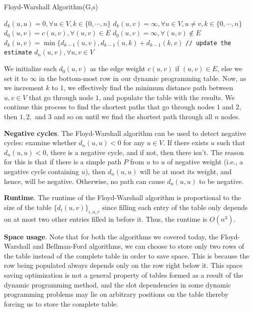 \documentclass [12pt]{article}
\theoremstyle{definition}
\begin{document}
\begin{algorithm}
\caption{Floyd-Warshall Algorithm(G,s)}
\label{alg:floyd-warshall}
\begin{algorithmic}
\STATE $d_k(u,u) = 0, \forall u \in V, k \in \{0, \cdots, n\}$
\STATE $d_k(u,v) = \infty, \forall u \in V, u\neq v, k \in \{0, \cdots, n\}$
\STATE $d_0(u,v) = c(u,v), \forall (u,v) \in E$
\STATE $d_0(u,v) = \infty, \forall (u,v) \notin E$
    \STATE $d_k(u,v) = \min\{ d_{k-1}(u,v), d_{k-1}(u,k) + d_{k-1}(k,v)$ \texttt{// update the estimate}
  \ENDFOR
\ENDFOR
\RETURN $d_n(u,v), \forall u,v \in V$
\end{algorithmic}
\end{algorithm}

We initialize each $d_0(u, v )$ as the edge weight $c(u, v )$ if $(u, v ) \in E$, else we set it to $\infty$ in the bottom-most row in our dynamic programming table. Now, as we increment $k$ to $1$, we effectively find the minimum distance path between $u, v \in V$ that go through node $1$, and populate the table with the results. We continue this process to find the shortest paths that go through nodes $1$ and $2$, then $1, 2,$ and $3$ and so on until we find the shortest path through all $n$ nodes. 

\textbf{Negative cycles}. The Floyd-Warshall algorithm can be used to detect negative cycles: examine whether $d_n(u, u) < 0$ for any $u \in V$. If there exists $u$ such that $d_n(u, u) < 0$, there is a negative cycle, and if not, then there isn't. The reason for this is that if there is a simple path $P$ from $u$ to $u$ of negative weight (i.e., a negative cycle containing $u$), then $d_n(u, u)$ will be at most its weight, and hence, will be negative. Otherwise, no path can cause $d_n(u, u)$ to be negative. 

\textbf{Runtime}. The runtime of the Floyd-Warshall algorithm is proportional to the size of the table $\{d_i (u, v )\}_{i,u,v}$ since filling each entry of the table only depends on at most two other entries filled in before it. Thus, the runtime is $O(n^3)$. 

\textbf{Space usage}. Note that for both the algorithms we covered today, the Floyd-Warshall and Bellman-Ford algorithms, we can choose to store only two rows of the table instead of the complete table in order to save space. This is because the row being populated always depends only on the row right below it. This space saving optimization is not a general property of tables formed as a result of the dynamic programming method, and the slot dependencies in some dynamic programming problems may lie on arbitrary positions on the table thereby forcing us to store the complete table.
\end{document}
